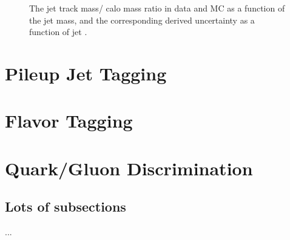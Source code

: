 \begin{figure}
\centering
{}
\label{fig:jet-reconstruction:jms_uncertainty}
\caption{The jet track mass/ calo mass ratio in data and MC as a function of the jet mass, and the corresponding derived uncertainty as a function of jet \pt.}
\end{figure}


\section{Pileup Jet Tagging}
\label{jet-reconstruction:pileup-jet-tagging}

\section{Flavor Tagging}

\section{Quark/Gluon Discrimination}
	\subsection{Lots of subsections}
		...
